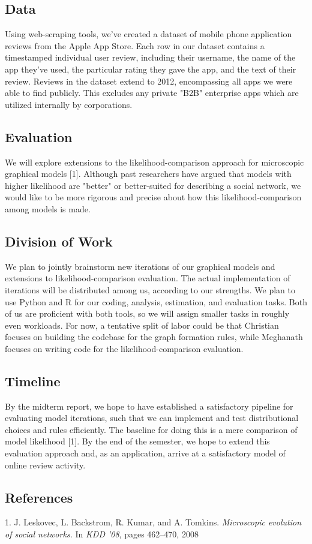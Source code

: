 \documentclass{article}
\begin{document}
\subsection{Data}
Using web-scraping tools, we've created a dataset of mobile phone application reviews from the Apple App Store. Each row in our dataset contains a timestamped individual user review, including their username, the name of the app they've used, the particular rating they gave the app, and the text of their review. Reviews in the dataset extend to 2012, encompassing all apps we were able to find publicly. This excludes any private "B2B" enterprise apps which are utilized internally by corporations.

\subsection{Evaluation}
We will explore extensions to the likelihood-comparison approach for microscopic graphical models [1]. Although past researchers have argued that models with higher likelihood are "better" or better-suited for describing a social network, we would like to be more rigorous and precise about how this likelihood-comparison among models is made.

\subsection{Division of Work}
We plan to jointly brainstorm new iterations of our graphical models and extensions to likelihood-comparison evaluation. The actual implementation of iterations will be distributed among us, according to our strengths. We plan to use Python and R for our coding, analysis, estimation, and evaluation tasks. Both of us are proficient with both tools, so we will assign smaller tasks in roughly even workloads. For now, a tentative split of labor could be that Christian focuses on building the codebase for the graph formation rules, while Meghanath focuses on writing code for the likelihood-comparison evaluation.

\subsection{Timeline}

By the midterm report, we hope to have established a satisfactory pipeline for evaluating model iterations, such that we can implement and test distributional choices and rules efficiently. The baseline for doing this is a mere comparison of model likelihood [1]. By the end of the semester, we hope to extend this evaluation approach and, as an application, arrive at a satisfactory model of online review activity.

\subsection{References}

1. J. Leskovec, L. Backstrom, R. Kumar, and A. Tomkins. \textit{Microscopic
evolution of social networks.} In \textit{KDD '08}, pages 462–470, 2008
\end{document}

